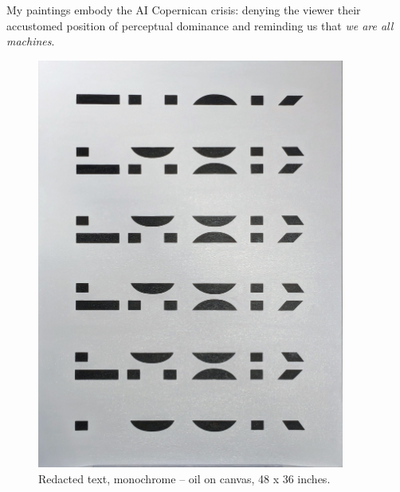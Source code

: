 \documentclass[12pt]{article}
\begin{document}
My paintings embody the AI Copernican crisis:
denying the viewer their accustomed position of perceptual dominance
and reminding us that \emph{we are all machines}.

\newpage
\begin{figure}[htbp]
  \centering
  \includegraphics*[width=0.9\textwidth]{black.jpg}
  \caption{Redacted text, monochrome -- oil on canvas, 48 x 36 inches.}
  \label{fig:black}
\end{figure}
\end{document}
